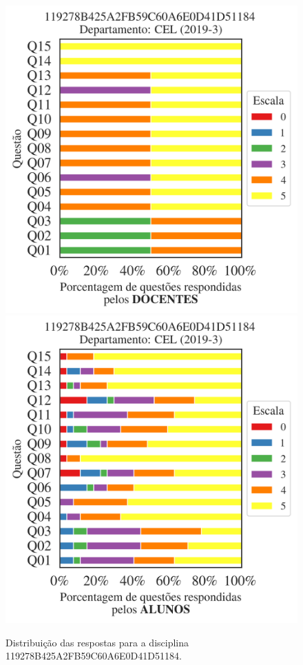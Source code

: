 \documentclass[a4paper,10pt]{article}
\begin{document}
\begin{figure}[h]
\centering
\includegraphics[width=0.485\linewidth]{analise_disciplina_departamento_CEL_119278B425A2FB59C60A6E0D41D51184_docentes.png}
\includegraphics[width=0.485\linewidth]{analise_disciplina_departamento_CEL_119278B425A2FB59C60A6E0D41D51184_alunos.png}
\caption{\label{fig:analise_geral_departamento}                Distribuição das respostas para a disciplina 119278B425A2FB59C60A6E0D41D51184. }
\end{figure}
\end{document}
